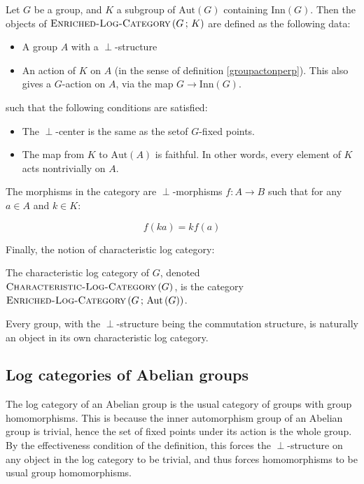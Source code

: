 \documentclass[a4paper]{amsart}
\newcommand{\enrichedlogcategory}[2]{\textsc{Enriched-Log-Category}\left(#1 \, ; \, #2\right)}
\newcommand{\characteristiclogcategory}[1]{\textsc{Characteristic-Log-Category}\left(#1 \right)}
\newcommand{\aut}[1]{\text{Aut}\left(#1\right)}
\newcommand{\inn}[1]{\text{Inn}\left(#1\right)}
\begin{document}
\begin{definer}
  Let $G$ be a group, and $K$ a subgroup of $\aut{G}$ containing
  $\inn{G}$. Then the objects of $\enrichedlogcategory{G}{K}$ are
  defined as the following data:

  \begin{itemize}

  \item A group $A$ with a $\perp$-structure

  \item An action of $K$ on $A$ (in the sense of definition
    \ref{groupactonperp}). This also gives a $G$-action on $A$, via
    the map $G \to \inn{G}$.

  \end{itemize}

  such that the following conditions are satisfied:

  \begin{itemize}

  \item The $\perp$-center is the same as the setof $G$-fixed points.

  \item The map from $K$ to $\aut{A}$ is faithful. In other
    words, every element of $K$ acts nontrivially on $A$.

  \end{itemize}

  The morphisms in the category are $\perp$-morphisms $f: A \to B$
  such that for any $a \in A$ and $k \in K$:

  $$f(ka) = kf(a)$$
\end{definer}

Finally, the notion of characteristic log category:

\begin{definer}
  The characteristic log category of $G$, denoted
  $\characteristiclogcategory{G}$, is the category
  $\enrichedlogcategory{G}{\aut{G}}$.
\end{definer}

Every group, with the $\perp$-structure being the commutation
structure, is naturally an object in its own characteristic log
category.

\subsection{Log categories of Abelian groups}

The log category of an Abelian group is the usual category of groups
with group homomorphisms. This is because the inner automorphism group
of an Abelian group is trivial, hence the set of fixed points under
its action is the whole group. By the effectiveness condition of the
definition, this forces the $\perp$-structure on any object in the log
category to be trivial, and thus forces homomorphisms to be usual
group homomorphisms.
\end{document}
